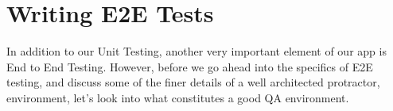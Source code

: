 \maketitle{}
\section{ Writing E2E Tests }

In addition to our Unit Testing, another very important element of our app is
End to End Testing. However, before we go ahead into the specifics of E2E
testing, and discuss some of the finer details of a well architected protractor,
environment, let's look into what constitutes a good QA environment.
